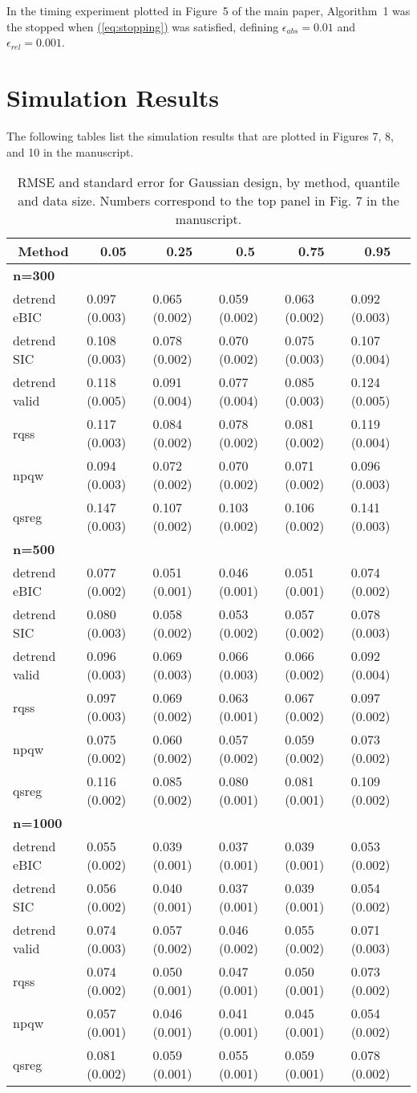 \documentclass[12pt]{article}
\numberwithin{equation}{section}
\theoremstyle{plain}
\newcommand{\Eqn}[1]{\hyperref[eq:#1]{{\rm (\ref*{eq:#1})}}} %
\newcommand{\Eqn}[1]{{(\ref{eq:#1})}} %
\begin{document}
In the timing experiment plotted in Figure~5 of the main paper, Algorithm~1 was the stopped when \Eqn{stopping} was satisfied, defining $\epsilon_{abs} = 0.01$ and $\epsilon_{rel} = 0.001$.


\newpage
\section{Simulation Results}

The following tables list the simulation results that are plotted in Figures 7, 8, and 10 in the manuscript.  

\begin{table}[!hbp]
\begin{center}
	\caption{RMSE and standard error for Gaussian design, by method, quantile and data size. Numbers correspond to the top panel in Fig. 7 in the manuscript.}
\begin{tabular}{llllll}
\hline\hline
\multicolumn{1}{c}{Method}&\multicolumn{1}{c}{0.05}&\multicolumn{1}{c}{0.25}&\multicolumn{1}{c}{0.5}&\multicolumn{1}{c}{0.75}&\multicolumn{1}{c}{0.95}\tabularnewline
\hline
{\bfseries n=300}&&&&&\tabularnewline
detrend eBIC&0.097 (0.003)&0.065 (0.002)&0.059 (0.002)&0.063 (0.002)&0.092 (0.003)\tabularnewline
detrend SIC&0.108 (0.003)&0.078 (0.002)&0.070 (0.002)&0.075 (0.003)&0.107 (0.004)\tabularnewline
detrend valid&0.118 (0.005)&0.091 (0.004)&0.077 (0.004)&0.085 (0.003)&0.124 (0.005)\tabularnewline
rqss&0.117 (0.003)&0.084 (0.002)&0.078 (0.002)&0.081 (0.002)&0.119 (0.004)\tabularnewline
npqw&0.094 (0.003)&0.072 (0.002)&0.070 (0.002)&0.071 (0.002)&0.096 (0.003)\tabularnewline
qsreg&0.147 (0.003)&0.107 (0.002)&0.103 (0.002)&0.106 (0.002)&0.141 (0.003)\tabularnewline
\hline
{\bfseries n=500}&&&&&\tabularnewline
detrend eBIC&0.077 (0.002)&0.051 (0.001)&0.046 (0.001)&0.051 (0.001)&0.074 (0.002)\tabularnewline
detrend SIC&0.080 (0.003)&0.058 (0.002)&0.053 (0.002)&0.057 (0.002)&0.078 (0.003)\tabularnewline
detrend valid&0.096 (0.003)&0.069 (0.003)&0.066 (0.003)&0.066 (0.002)&0.092 (0.004)\tabularnewline
rqss&0.097 (0.003)&0.069 (0.002)&0.063 (0.001)&0.067 (0.002)&0.097 (0.002)\tabularnewline
npqw&0.075 (0.002)&0.060 (0.002)&0.057 (0.002)&0.059 (0.002)&0.073 (0.002)\tabularnewline
qsreg&0.116 (0.002)&0.085 (0.002)&0.080 (0.001)&0.081 (0.001)&0.109 (0.002)\tabularnewline
\hline
{\bfseries n=1000}&&&&&\tabularnewline
detrend eBIC&0.055 (0.002)&0.039 (0.001)&0.037 (0.001)&0.039 (0.001)&0.053 (0.002)\tabularnewline
detrend SIC&0.056 (0.002)&0.040 (0.001)&0.037 (0.001)&0.039 (0.001)&0.054 (0.002)\tabularnewline
detrend valid&0.074 (0.003)&0.057 (0.002)&0.046 (0.002)&0.055 (0.002)&0.071 (0.003)\tabularnewline
rqss&0.074 (0.002)&0.050 (0.001)&0.047 (0.001)&0.050 (0.001)&0.073 (0.002)\tabularnewline
npqw&0.057 (0.001)&0.046 (0.001)&0.041 (0.001)&0.045 (0.001)&0.054 (0.002)\tabularnewline
qsreg&0.081 (0.002)&0.059 (0.001)&0.055 (0.001)&0.059 (0.001)&0.078 (0.002)\tabularnewline
\hline
\end{tabular}\end{center}
\end{table}
\end{document}
